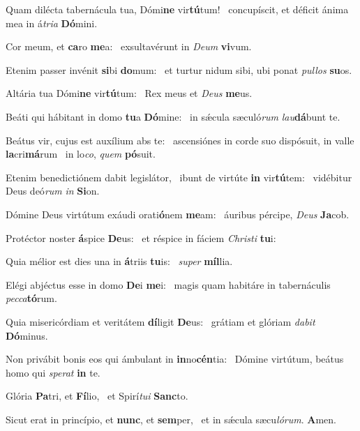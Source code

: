 \item Quam dilécta tabernácula tua, Dómi\textbf{ne} vir\textbf{tú}tum!~\psstar{} concupíscit, et déficit ánima mea in á\textit{tria} \textbf{Dó}mini.
\item Cor meum, et \textbf{ca}ro \textbf{me}a:~\psstar{} exsultavérunt in \textit{Deum} \textbf{vi}vum.
\item Etenim passer invénit \textbf{si}bi \textbf{do}mum:~\psstar{} et turtur nidum sibi, ubi ponat \textit{pullos} \textbf{su}os.
\item Altária tua Dómi\textbf{ne} vir\textbf{tú}\-tum:~\psstar{} Rex meus et \textit{Deus} \textbf{me}us.
\item Beáti qui hábitant in domo \textbf{tu}a \textbf{Dó}mine:~\psstar{} in sǽcula sæculó\textit{rum} \textit{lau}\textbf{dá}bunt te.
\item Beátus vir, cujus est auxílium abs te:~\pscross{} ascensiónes in corde suo dispósuit, in valle \textbf{la}cri\textbf{má}rum~\psstar{} in lo\textit{co}, \textit{quem} \textbf{pó}suit.
\item Etenim benedictiónem dabit legislátor,~\pscross{} ibunt de virtúte \textbf{in} vir\textbf{tú}tem:~\psstar{} vidébitur Deus deó\textit{rum} \textit{in} \textbf{Si}on.
\item Dómine Deus virtútum exáudi orati\textbf{ó}nem \textbf{me}am:~\psstar{} áuribus pércipe, \textit{Deus} \textbf{Ja}cob.
\item Protéctor noster \textbf{á}spice \textbf{De}us:~\psstar{} et réspice in fáciem \textit{Christi} \textbf{tu}i:
\item Quia mélior est dies una in \textbf{á}triis \textbf{tu}is:~\psstar{} \textit{super} \textbf{míl}lia.
\item Elégi abjéctus esse in domo \textbf{De}i \textbf{me}i:~\psstar{} magis quam habitáre in tabernáculis \textit{pecca}\textbf{tó}rum.
\item Quia misericórdiam et veritátem \textbf{dí}ligit \textbf{De}us:~\psstar{} grátiam et glóriam \textit{dabit} \textbf{Dó}minus.
\item Non privábit bonis eos qui ámbulant in \textbf{in}no\textbf{cén}tia:~\psstar{} Dómine virtútum, beátus homo qui \textit{sperat} \textbf{in} te.
\item Glória \textbf{Pa}tri, et \textbf{Fí}lio,~\psstar{} et Spirí\textit{tui} \textbf{Sanc}to.
\item Sicut erat in princípio, et \textbf{nunc}, et \textbf{sem}per,~\psstar{} et in sǽcula sæcu\textit{lórum}. \textbf{A}men.